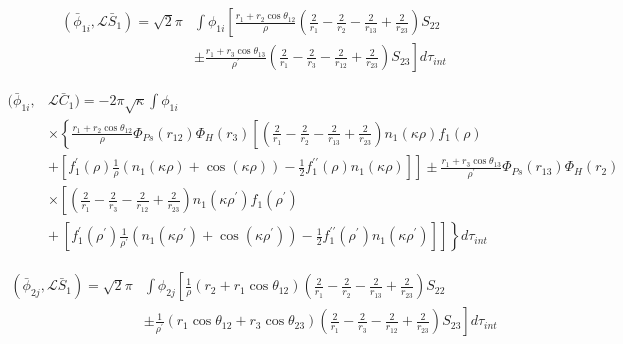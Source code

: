 \documentclass[Dissertation.tex]{subfiles}
\begin{document}
\begin{align}
\label{eq:PWavePhi1SBar}
\nonumber \left(\bar{\phi}_{1i},\mathcal{L} \bar{S}_1\right) = \sqrt{2} \pi & \int \phi_{1i} \left[ \frac{r_1 + r_2 \cos\theta_{12}}{\rho} \left( \frac{2}{r_1} - \frac{2}{r_2} - \frac{2}{r_{13}} + \frac{2}{r_{23}} \right) S_{22} \right. \\
& \pm \left. \frac{r_1 + r_3 \cos\theta_{13}}{\rho^\prime} \left( \frac{2}{r_1} - \frac{2}{r_3} - \frac{2}{r_{12}} + \frac{2}{r_{23}} \right) S_{23} \right]  d\tau_{int}
\end{align}

\begin{align}
\label{eq:PWavePhi1CBar}
\nonumber (\bar{\phi}_{1i},&\mathcal{L} \bar{C}_1) = -2 \pi \sqrt{\kappa} \int \phi_{1i} \\
\nonumber & \times \left\{ \frac{r_1 + r_2 \cos\theta_{12}}{\rho} \Phi_{Ps}(r_{12}) \Phi_H(r_3) \left[ \left( \frac{2}{r_1} - \frac{2}{r_2} - \frac{2}{r_{13}} + \frac{2}{r_{23}} \right) n_1(\kappa\rho) f_1(\rho) \right. \right. \\
\nonumber & + \left.\left. \left[f_1^\prime(\rho) \frac{1}{\rho} \left( n_1(\kappa\rho) + \cos(\kappa\rho) \right) - \frac{1}{2} f_1^{\prime\prime}(\rho) n_1(\kappa\rho) \right]\right] \pm \frac{r_1 + r_3 \cos\theta_{13}}{\rho^\prime}  \Phi_{Ps}(r_{13}) \Phi_H(r_2) \right. \\
\nonumber & \times \left[ \left( \frac{2}{r_1} - \frac{2}{r_3} - \frac{2}{r_{12}} + \frac{2}{r_{23}} \right) n_1(\kappa\rho^\prime) f_1(\rho^\prime) \right. \\ 
& \left.\left. + \ \left[f_1^\prime(\rho^\prime) \frac{1}{\rho^\prime} \left( n_1(\kappa\rho^\prime) + \cos(\kappa\rho^\prime) \right) - \frac{1}{2} f_1^{\prime\prime}(\rho^\prime) n_1(\kappa\rho^\prime) \right]\right]\right\} d\tau_{int}
\end{align}

\begin{align}
\label{eq:PWavePhi2SBar}
\nonumber \left(\bar{\phi}_{2j},\mathcal{L} \bar{S}_1\right) = \sqrt{2} \pi & \int \phi_{2j} \left[ \frac{1}{\rho} \left(r_2 + r_1 \cos\theta_{12}\right) \left( \frac{2}{r_1} - \frac{2}{r_2} - \frac{2}{r_{13}} + \frac{2}{r_{23}} \right) S_{22} \right. \\
& \pm \left. \frac{1}{\rho^\prime} \left(r_1 \cos\theta_{12} + r_3 \cos\theta_{23}\right) \left( \frac{2}{r_1} - \frac{2}{r_3} - \frac{2}{r_{12}} + \frac{2}{r_{23}} \right) S_{23} \right]  d\tau_{int}
\end{align}
\end{document}
